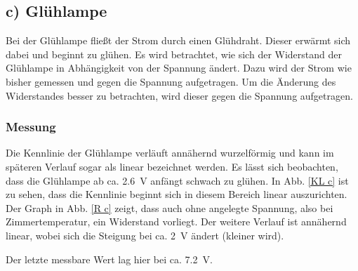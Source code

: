 \documentclass[11pt,a4paper,titlepage, ngerman]{article}
\begin{document}
		\subsection{c) Glühlampe} 
			
			Bei der Glühlampe fließt der Strom durch einen Glühdraht. Dieser erwärmt sich dabei und beginnt zu glühen. Es wird betrachtet, wie sich der Widerstand der Glühlampe in Abhängigkeit von der Spannung ändert. Dazu wird der Strom wie bisher gemessen und gegen die Spannung aufgetragen.
			Um die Änderung des Widerstandes besser zu betrachten, wird dieser gegen die Spannung aufgetragen. 
			
			\subsubsection*{Messung}
				
				Die Kennlinie der Glühlampe verläuft annähernd wurzelförmig und kann im späteren Verlauf sogar als linear bezeichnet werden. Es lässt sich beobachten, dass die Glühlampe ab ca. \SI{2.6}{\volt} anfängt schwach zu glühen. In Abb. \ref{KL c} ist zu sehen, dass die Kennlinie beginnt sich in diesem Bereich linear auszurichten.
				Der Graph in Abb. \ref{R c} zeigt, dass auch ohne angelegte Spannung, also bei Zimmertemperatur, ein Widerstand vorliegt. Der weitere Verlauf ist annähernd linear, wobei sich die Steigung bei ca. \SI{2}{\volt} ändert (kleiner wird).
				
				Der letzte messbare Wert lag hier bei ca. \SI{7.2}{\volt}.
				
\end{document}
